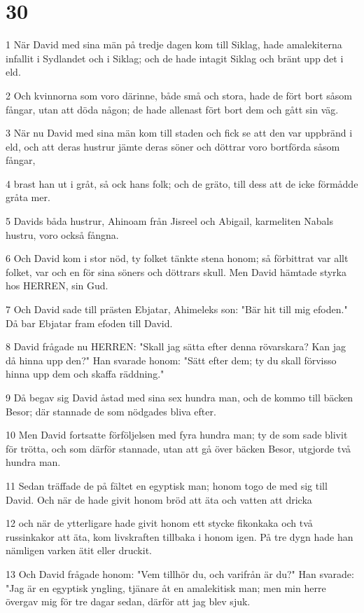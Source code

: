\chapter{30}

\par 1 När David med sina män på tredje dagen kom till Siklag, hade amalekiterna infallit i Sydlandet och i Siklag; och de hade intagit Siklag och bränt upp det i eld.
\par 2 Och kvinnorna som voro därinne, både små och stora, hade de fört bort såsom fångar, utan att döda någon; de hade allenast fört bort dem och gått sin väg.
\par 3 När nu David med sina män kom till staden och fick se att den var uppbränd i eld, och att deras hustrur jämte deras söner och döttrar voro bortförda såsom fångar,
\par 4 brast han ut i gråt, så ock hans folk; och de gräto, till dess att de icke förmådde gråta mer.
\par 5 Davids båda hustrur, Ahinoam från Jisreel och Abigail, karmeliten Nabals hustru, voro också fångna.
\par 6 Och David kom i stor nöd, ty folket tänkte stena honom; så förbittrat var allt folket, var och en för sina söners och döttrars skull. Men David hämtade styrka hos HERREN, sin Gud.
\par 7 Och David sade till prästen Ebjatar, Ahimeleks son: "Bär hit till mig efoden." Då bar Ebjatar fram efoden till David.
\par 8 David frågade nu HERREN: "Skall jag sätta efter denna rövarskara? Kan jag då hinna upp den?" Han svarade honom: "Sätt efter dem; ty du skall förvisso hinna upp dem och skaffa räddning."
\par 9 Då begav sig David åstad med sina sex hundra man, och de kommo till bäcken Besor; där stannade de som nödgades bliva efter.
\par 10 Men David fortsatte förföljelsen med fyra hundra man; ty de som sade blivit för trötta, och som därför stannade, utan att gå över bäcken Besor, utgjorde två hundra man.
\par 11 Sedan träffade de på fältet en egyptisk man; honom togo de med sig till David. Och när de hade givit honom bröd att äta och vatten att dricka
\par 12 och när de ytterligare hade givit honom ett stycke fikonkaka och två russinkakor att äta, kom livskraften tillbaka i honom igen. På tre dygn hade han nämligen varken ätit eller druckit.
\par 13 Och David frågade honom: "Vem tillhör du, och varifrån är du?" Han svarade: "Jag är en egyptisk yngling, tjänare åt en amalekitisk man; men min herre övergav mig för tre dagar sedan, därför att jag blev sjuk.
